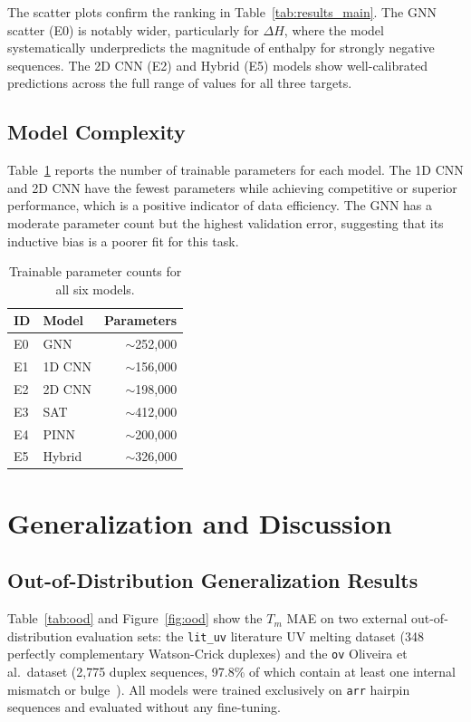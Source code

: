 \documentclass[12pt,oneside,letterpaper]{report}
\begin{document}
The scatter plots confirm the ranking in Table~\ref{tab:results_main}. The GNN scatter (E0) is notably wider, particularly for $\Delta H$, where the model systematically underpredicts the magnitude of enthalpy for strongly negative sequences. The 2D CNN (E2) and Hybrid (E5) models show well-calibrated predictions across the full range of values for all three targets.

\section{Model Complexity}

Table~\ref{tab:params} reports the number of trainable parameters for each model. The 1D CNN and 2D CNN have the fewest parameters while achieving competitive or superior performance, which is a positive indicator of data efficiency. The GNN has a moderate parameter count but the highest validation error, suggesting that its inductive bias is a poorer fit for this task.

\begin{table}[h!]
\centering
\caption{Trainable parameter counts for all six models.}
\label{tab:params}
\begin{tabular}{llr}
\toprule
ID & Model & Parameters \\
\midrule
E0 & GNN   & $\sim$252,000 \\
E1 & 1D CNN & $\sim$156,000 \\
E2 & 2D CNN & $\sim$198,000 \\
E3 & SAT   & $\sim$412,000 \\
E4 & PINN  & $\sim$200,000 \\
E5 & Hybrid & $\sim$326,000 \\
\bottomrule
\end{tabular}
\end{table}

\chapter{Generalization and Discussion}

\section{Out-of-Distribution Generalization Results}

Table~\ref{tab:ood} and Figure~\ref{fig:ood} show the $T_m$ MAE on two external out-of-distribution evaluation sets: the \texttt{lit\_uv} literature UV melting dataset (348 perfectly complementary Watson-Crick duplexes) and the \texttt{ov} Oliveira et al.\ dataset (2,775 duplex sequences, 97.8\% of which contain at least one internal mismatch or bulge~\cite{oliveira2020}). All models were trained exclusively on \texttt{arr} hairpin sequences and evaluated without any fine-tuning.
\end{document}
